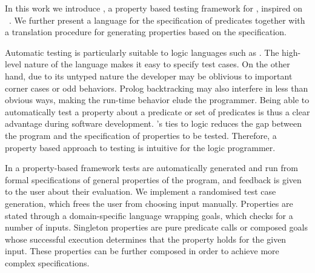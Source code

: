 In this work we introduce \plqc{}, a
property based testing framework for \Prolog{}, inspired on
 \QuickCheck~\cite{quickcheck}.
%
We further present a language for the specification of \Prolog{} predicates
together with a translation procedure for generating \plqc{} properties
based on the specification.


Automatic testing is particularly suitable to logic languages such as
\Prolog{}. The high-level nature of the language makes it easy to
specify test cases.
%
On the other hand, due to its untyped nature the developer may be
oblivious to important corner cases or odd behaviors.
%
Prolog backtracking may also interfere in less than obvious
ways, making the run-time behavior elude the programmer.
%
Being able to automatically test a property about a predicate or set of
predicates is thus a clear advantage during software development.
%
\Prolog{}'s ties to logic reduces the gap between the program and the
specification of properties to be tested.
%
Therefore, a property based approach to testing is intuitive for the
logic programmer.  


In a property-based framework tests are automatically generated and run from formal specifications of general
properties of the program, and feedback is given to the user about their
evaluation.
%
We implement a randomised test case generation, which frees the user
from choosing input manually.
%
Properties are stated through a domain-specific language wrapping
\Prolog{} goals, which \plqc{} checks for a number of inputs.
%
Singleton properties are pure predicate calls
or composed goals whose successful execution determines that the
property holds for the given input.
%
These properties can be further composed in order to achieve more complex
specifications.




